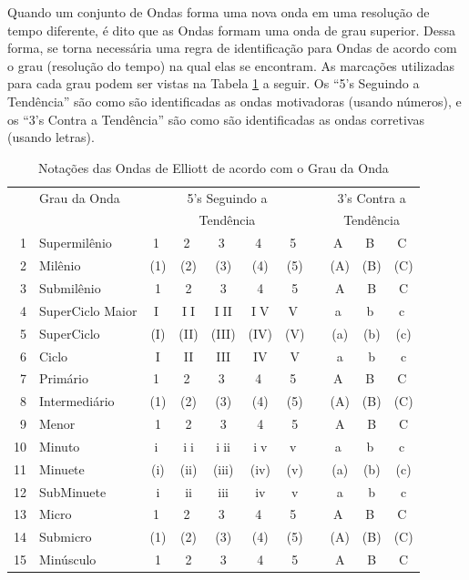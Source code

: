 \documentclass[12pt]{article}
\def\m#1{{\normalsize\textcircled{\scriptsize #1}}}
\begin{document}
Quando um conjunto de Ondas forma uma nova onda em uma resolução de tempo diferente, é dito que
as Ondas formam uma onda de grau superior. Dessa forma, se torna necessária uma regra de
identificação para Ondas de acordo com o grau (resolução do tempo) na qual elas se encontram.
As marcações utilizadas para cada grau podem ser vistas na
Tabela \ref{tab:ElliottWaveDegreeNotations} a seguir. Os ``5's Seguindo a Tendência'' são
como são identificadas as ondas motivadoras (usando números), e os
``3's Contra a Tendência'' são como são identificadas as ondas corretivas (usando letras).

\begingroup
\scriptsize
\begin{table}[H]
	\centering
	\caption{Notações das Ondas de Elliott de acordo com o Grau da Onda}
	\label{tab:ElliottWaveDegreeNotations}
\begin{tabular}{rlccccccccc}
   & \multicolumn{1}{l}{Grau da Onda} & \multicolumn{5}{c}{5's Seguindo a} &  & \multicolumn{3}{c}{3's Contra a} \\
   & \multicolumn{1}{c}{} & \multicolumn{5}{c}{Tendência} &  & \multicolumn{3}{c}{Tendência} \\
\toprule
 1 & Supermilênio		& \m{1}	& \m{2}	& \m{3}	& \m{4}	& \m{5}	& & \m{A} & \m{B} & \m{C} \\
 2 & Milênio			& (1)	& (2)	& (3)	& (4)	& (5)	& & (A)	  & (B)	  & (C)	  \\
 3 & Submilênio			& 1		& 2		& 3		& 4		& 5		& & A	  & B	  & C	  \\
\midrule
 4 & SuperCiclo Maior	& \m{I}	&\m{II}	&\m{III}&\m{IV}	& \m{V}	& & \m{a} & \m{b} & \m{c} \\
 5 & SuperCiclo			& (I)	& (II)	& (III)	& (IV)	& (V)	& & (a)	  & (b)	  & (c)	  \\
 6 & Ciclo				& I		& II	& III	& IV	& V		& & a	  & b	  & c	  \\
\midrule
 7 & Primário			& \m{1}	& \m{2}	& \m{3}	& \m{4}	& \m{5}	& & \m{A} & \m{B} & \m{C} \\
 8 & Intermediário		& (1)	& (2)	& (3)	& (4)	& (5)	& & (A)	  & (B)	  & (C)	  \\
 9 & Menor				& 1		& 2		& 3		& 4		& 5		& & A	  & B	  & C	  \\
\midrule
10 & Minuto				& \m{i}	&\m{ii}	&\m{iii}&\m{iv}	& \m{v}	& & \m{a} & \m{b} & \m{c} \\
11 & Minuete			& (i)	& (ii)	& (iii)	& (iv)	& (v)	& & (a)	  & (b)	  & (c)	  \\
12 & SubMinuete			& i		& ii	& iii	& iv	& v		& & a	  & b	  & c	  \\
\midrule
13 & Micro				& \m{1}	& \m{2}	& \m{3}	& \m{4}	& \m{5}	& & \m{A} & \m{B} & \m{C} \\
14 & Submicro			& (1)	& (2)	& (3)	& (4)	& (5)	& & (A)	  & (B)	  & (C)	  \\
15 & Minúsculo			& 1		& 2		& 3		& 4		& 5		& & A	  & B	  & C	  \\
\end{tabular}
\end{table}
\endgroup
\end{document}
